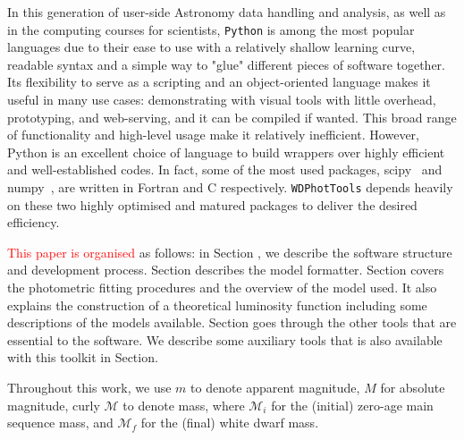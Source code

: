\documentclass[fleqn,usenatbib]{rasti}
\begin{document}
In this generation of user-side Astronomy data handling and analysis, as well
as in the computing courses for scientists, \texttt{Python} is among the most
popular languages due to their ease to use with a relatively shallow learning
curve, readable syntax and a simple way to "glue" different pieces of software
together. Its flexibility to serve as a scripting and an object-oriented
language makes it useful in many use cases: demonstrating with visual tools
with little overhead, prototyping, and web-serving, and it can be compiled if
wanted. This broad range of functionality and high-level usage make it
relatively inefficient. However, Python is an excellent choice of language to
build wrappers over highly efficient and well-established codes. In fact,
some of the most used packages, scipy~\citep{2020NatMe..17..261V} and
numpy~\citep{2020Natur.585..357H}, are written in Fortran and C respectively.
\texttt{WDPhotTools} depends heavily on these two highly optimised and matured
packages to deliver the desired efficiency.

\textcolor{red}{This paper is organised} as follows: in Section , we describe
the software structure and development process. Section  describes
the model formatter. Section  covers the photometric fitting
procedures and the overview of the model used. It also explains the
construction of a theoretical luminosity function including some descriptions
of the models available. Section  goes through the other tools
that are essential to the software. We describe some auxiliary tools that is
also available with this toolkit in Section.

Throughout this work, we use $m$ to denote apparent magnitude, $M$ for
absolute magnitude, curly $\mathcal{M}$ to denote mass, where $\mathcal{M}_i$
for the (initial) zero-age main sequence mass, and $\mathcal{M}_f$ for the
(final) white dwarf mass.
\end{document}
